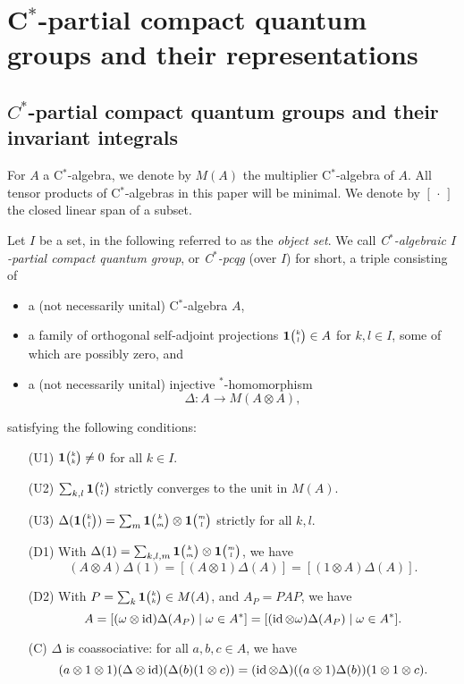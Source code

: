 \section{C$^*$-partial compact quantum groups and their representations}


\subsection{$C^{*}$-partial compact quantum groups and their invariant integrals}

For $A$ a C$^*$-algebra, we denote by $M(A)$ the multiplier C$^*$-algebra of $A$. All tensor products of C$^*$-algebras in this paper will be minimal. We denote by $[\,\cdot\,]$ the closed linear span of a subset.

\begin{Def}\label{DefCpcqg} Let $I$ be a set, in the following referred to as the \emph{object set}. We call \emph{C$^*$-algebraic $I$-partial compact quantum group}, or \emph{C$^*$-pcqg} (over $I$) for short, a triple consisting of 
\begin{itemize}
\item a (not necessarily unital) C$^*$-algebra $A$,
\item a family of orthogonal self-adjoint projections $\mathbf{1}{\tiny {\begin{pmatrix} k\\l\end{pmatrix}}}\in A$ for $k,l\in I$, some of which are possibly zero, and
\item  a (not necessarily unital) injective $^*$-homomorphism \[\Delta: A\rightarrow M(A\otimes A),\] 
\end{itemize}
satisfying the following conditions:
\begin{enumerate}[(a)]
\item[(U1)] $\mathbf{1}{\tiny {\begin{pmatrix} k\\k\end{pmatrix}}}\neq 0$ for all $k\in I$. 
\item[(U2)] $\sum_{k,l} \mathbf{1}{\tiny {\begin{pmatrix} k\\l\end{pmatrix}}}$ strictly converges to the unit in $M(A)$.
\item[(U3)] $\Delta(\mathbf{1}{\tiny {\begin{pmatrix} k\\l\end{pmatrix}}}) = \sum_{m}\mathbf{1}{\tiny {\begin{pmatrix} k\\m\end{pmatrix}}}\otimes \mathbf{1}{\tiny {\begin{pmatrix} m\\l\end{pmatrix}}}$ strictly for all $k,l$. 
\item[(D1)] With $\Delta(1) = \sum_{k,l,m} \mathbf{1}{\tiny {\begin{pmatrix} k\\m\end{pmatrix}}}\otimes \mathbf{1}{\tiny {\begin{pmatrix} m\\l\end{pmatrix}}}$, we have \begin{equation}\label{CondDi}(A\otimes A)\Delta(1) = [(A\otimes 1)\Delta(A)] = [(1\otimes A)\Delta(A)].\end{equation} 
\item[(D2)] With $P=\sum_{k} \mathbf{1}{\tiny {\begin{pmatrix} k\\k\end{pmatrix}}}\in M(A)$, and $A_P = PAP$, we have \[A=[(\omega\otimes \operatorname{id})\Delta(A_P)\mid \omega \in A^*] = [(\operatorname{id}\otimes \omega)\Delta(A_P)\mid \omega \in A^*].\]
\item[(C)] $\Delta$ is coassociative: for all $a,b,c\in A$, we have \[(a\otimes 1\otimes 1)(\Delta\otimes \operatorname{id})(\Delta(b)(1\otimes c)) = (\operatorname{id}\otimes \Delta)((a\otimes 1)\Delta(b))(1\otimes 1\otimes c).\] 
\end{enumerate}
\end{Def} 

